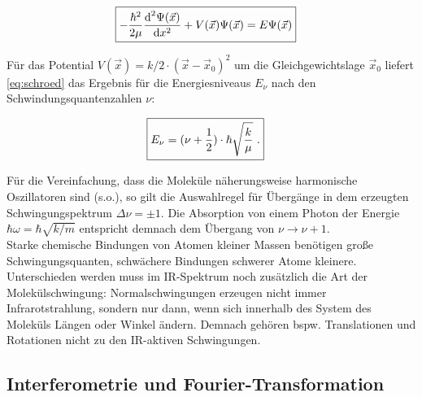 \documentclass[a4paper,10pt,twocolumn]{article}
\newcommand{\diff}{\textnormal{d}}
\newcommand{\ix}[1]{_\text{#1}}
\begin{document}
			\begin{align}
				\Aboxed{
				-\frac{\hbar^{2}}{2\mu}\frac{\diff^{2}\Psi(\vec{x})}{\diff x^{2}}+V(\vec{x})\Psi(\vec{x})=E\Psi(\vec{x})
				}
				\label{eq:schroed}
			\end{align}
	
		F\"ur das Potential $V(\vec{x})=k/2\cdot (\vec{x}-\vec{x}\ix{0})^{2}$ um die Gleichgewichtslage $\vec{x}\ix{0}$ liefert \autoref{eq:schroed} das Ergebnis f\"ur die Energiesniveaus $E_{\nu}$ nach den Schwindungsquantenzahlen $\nu$:
	
			\begin{align}
				\Aboxed{E_{\nu}=(\nu+\frac{1}{2})\cdot\hbar\sqrt{\frac{k}{\mu}}\,\, .
				}
			\end{align}
	
		F\"ur die Vereinfachung, dass die Molek\"ule n\"aherungsweise harmonische Oszillatoren sind (s.o.), so gilt die Auswahlregel f\"ur \"Uberg\"ange in dem erzeugten Schwingungspektrum $\Delta\nu=\pm1$. Die Absorption von einem Photon der Energie $\hbar\omega=\hbar\sqrt{k/m}$ entspricht demnach dem \"Ubergang von $\nu\rightarrow\nu+1$.\\
		Starke chemische Bindungen von Atomen kleiner Massen ben\"otigen gro{\ss}e Schwingungsquanten, schw\"achere Bindungen schwerer Atome kleinere.\\
		Unterschieden werden muss im IR-Spektrum noch zus\"atzlich die Art der Molek\"ulschwingung: Normalschwingungen erzeugen nicht immer Infrarotstrahlung, sondern nur dann, wenn sich innerhalb des System des Molek\"uls L\"angen oder Winkel \"andern. Demnach geh\"oren bspw. Translationen und Rotationen nicht zu den IR-aktiven Schwingungen.
	
	\subsection{Interferometrie und Fourier-Transformation}
	
\end{document}

